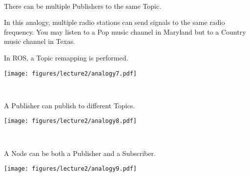 \documentclass[usenames,11,dvipsnames,svgnames,x11names,aspectratio=1610,bibref]{beamer}
\newcommand{\mydisclaimer}{{\color{disclaimer}{\scriptsize ROS 2 -- Part I}}}
\newcommand{\iconColor}[1]{\textcolor{iconColor}{#1}}
\renewcommand\sec{{\cnordSix{\secname}\hfill\mydisclaimer~} }
\newcommand{\mynote}{\iconColor{\faEdit}\xspace}
\begin{document}
 
\begin{frame}[fragile]{\sec}
\vspace*{\fill}
\begin{center} 
There can be multiple Publishers to the same Topic. 

\hrulefill

\begin{compactitem}
\footnotesize

\item In this analogy, multiple radio stations can send signals to the same radio frequency. You may listen to a Pop music channel in Maryland but to a Country music channel in Texas.
\item \mynote In ROS, a Topic remapping is performed.
\end{compactitem}

\texttt{[image: figures/lecture2/analogy7.pdf]}

\end{center}
\vspace*{\fill}
\end{frame}


\begin{frame}[fragile]{\sec}
\vspace*{\fill}
\begin{center} 
A Publisher can publish to different Topics.

\hrulefill

\texttt{[image: figures/lecture2/analogy8.pdf]}

\end{center}
\vspace*{\fill}
\end{frame}



\begin{frame}[fragile]{\sec}
\vspace*{\fill}
\begin{center} 
A Node can be both a Publisher and a Subscriber.

\hrulefill

\texttt{[image: figures/lecture2/analogy9.pdf]}

\end{center}
\vspace*{\fill}
\end{frame}
\end{document}
